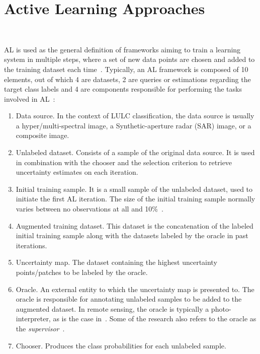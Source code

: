 \documentclass[parskip=full]{scrartcl}
\begin{document}
\section{Active Learning Approaches}~\label{sec:al-sota}

AL is used as the general definition of frameworks aiming to train a learning
system in multiple steps, where a set of new data points are chosen and added to
the training dataset each time~\cite{Ruzicka2020}. Typically, an AL framework is
composed of 10 elements, out of which 4 are datasets, 2 are queries or
estimations regarding the target class labels and 4 are components responsible
for performing the tasks involved in AL~\cite{Sverchkov2017,Su2020,Ruzicka2020}:

\begin{enumerate}
    \item Data source. In the context of LULC classification, the data source is
        usually a hyper/multi-spectral image, a Synthetic-aperture radar (SAR)
        image, or a composite image.
    \item Unlabeled dataset. Consists of a sample of the original data source.
        It is used in combination with the chooser and the selection criterion
        to retrieve uncertainty estimates on each iteration.
    \item Initial training sample. It is a small sample of the unlabeled
        dataset, used to initiate the first AL iteration. The size of the
        initial training sample normally varies between no observations at all
        and 10\%~\cite{Li2013}.
    \item Augmented training dataset. This dataset is the concatenation of the
        labeled initial training sample along with the datasets labeled by the
        oracle in past iterations.
    \item Uncertainty map. The dataset containing the highest uncertainty
        points/patches to be labeled by the oracle.
    \item Oracle. An external entity to which the uncertainty map is presented
        to. The oracle is responsible for annotating unlabeled samples to be
        added to the augmented dataset. In remote sensing, the oracle is
        typically a photo-interpreter, as is the case in~\cite{li2020}. Some of
        the research also refers to the oracle as the
        \textit{supervisor}~\cite{Su2020, Shrivastava2021}.
    \item Chooser. Produces the class probabilities for each unlabeled sample.

\end{enumerate}
\end{document}
